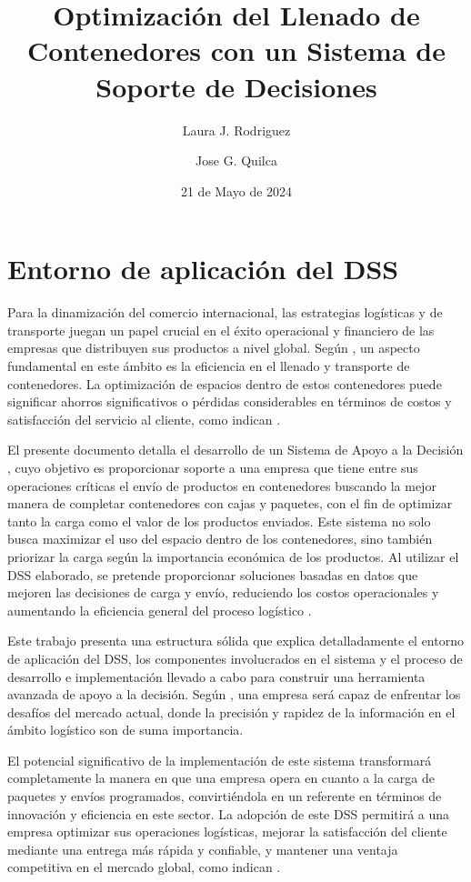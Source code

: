 \documentclass[9pt,a4paper]{rho}
\title{Optimización del Llenado de Contenedores con un Sistema de Soporte de Decisiones}
\author[$\dagger$]{Laura J. Rodriguez}
\author[$\dagger$]{Jose G. Quilca}
\affil[$\dagger$]{Centro de Investigación Operativa, Universidad Miguel Hernández, 03202 Elche, Alicante, España}
\date{21 de Mayo de 2024} %
\begin{document}
\maketitle
\thispagestyle{firststyle}


\section{Entorno de aplicación del DSS}

Para la dinamización del comercio internacional, las estrategias logísticas y de transporte juegan un papel crucial en el éxito operacional y financiero de las empresas que distribuyen sus productos a nivel global. Según \textcite{rushton2017international}, un aspecto fundamental en este ámbito es la eficiencia en el llenado y transporte de contenedores. La optimización de espacios dentro de estos contenedores puede significar ahorros significativos o pérdidas considerables en términos de costos y satisfacción del servicio al cliente, como indican \textcite{bortfeldt2013container}.

El presente documento detalla el desarrollo de un Sistema de Apoyo a la Decisión \cite{jao2010decision}, cuyo objetivo es proporcionar soporte a una empresa que tiene entre sus operaciones críticas el envío de productos en contenedores buscando la mejor manera de completar contenedores con cajas y paquetes, con el fin de optimizar tanto la carga como el valor de los productos enviados. Este sistema no solo busca maximizar el uso del espacio dentro de los contenedores, sino también priorizar la carga según la importancia económica de los productos. Al utilizar el DSS elaborado, se pretende proporcionar soluciones basadas en datos que mejoren las decisiones de carga y envío, reduciendo los costos operacionales y aumentando la eficiencia general del proceso logístico \cite{simchi2003logistics}.

Este trabajo presenta una estructura sólida que explica detalladamente el entorno de aplicación del DSS, los componentes involucrados en el sistema y el proceso de desarrollo e implementación llevado a cabo para construir una herramienta avanzada de apoyo a la decisión. Según \textcite{christopher2016logistics}, una empresa será capaz de enfrentar los desafíos del mercado actual, donde la precisión y rapidez de la información en el ámbito logístico son de suma importancia.

El potencial significativo de la implementación de este sistema transformará completamente la manera en que una empresa opera en cuanto a la carga de paquetes y envíos programados, convirtiéndola en un referente en términos de innovación y eficiencia en este sector. La adopción de este DSS permitirá a una empresa optimizar sus operaciones logísticas, mejorar la satisfacción del cliente mediante una entrega más rápida y confiable, y mantener una ventaja competitiva en el mercado global, como indican \parencite{slack2010operations}.
\end{document}
